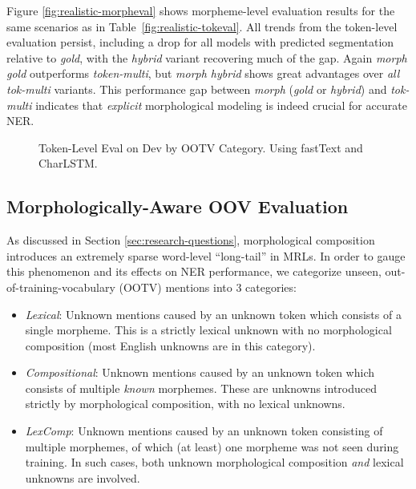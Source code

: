 \documentclass[11pt,a4paper]{article}
\newcommand{\MULMACRO}{{\em token-multi}\xspace}
\begin{document}
Figure \ref{fig:realistic-morpheval} shows morpheme-level evaluation results for the same scenarios as in Table~\ref{fig:realistic-tokeval}. 
All trends from the token-level evaluation persist, including  a drop for all models with predicted segmentation relative to {\em gold}, with the {\em hybrid} variant recovering much of the gap.
Again {\em morph gold}  outperforms \MULMACRO, but {\em morph hybrid} shows great advantages over {\em all} {\em tok-multi} variants. This  performance gap  between {\em morph} ({\em gold} or {\em hybrid}) and {\em tok-multi} indicates that {\em explicit} morphological modeling is indeed crucial for  accurate NER. 


\begin{figure}[t]
  \caption{\label{fig:analysis-ootv-fasttext} 
  Token-Level Eval on Dev by OOTV Category. Using fastText and CharLSTM.}
\end{figure}

\subsection{Morphologically-Aware OOV Evaluation}
\label{subsec:oov}


As discussed in Section \ref{sec:research-questions}, morphological composition introduces an extremely sparse word-level ``long-tail'' in MRLs. In order to gauge this phenomenon and its effects on NER performance, we categorize unseen, out-of-training-vocabulary (OOTV) mentions into 3 categories:
\begin{itemize}
    \item \emph{Lexical}: Unknown mentions caused by an unknown token which consists of a single morpheme. This is a strictly lexical unknown with no morphological composition  (most English   unknowns are in this category).
    \item \emph{Compositional}: Unknown mentions caused by an unknown token which consists of multiple \emph{known} morphemes. These are unknowns introduced strictly by morphological composition, with no lexical unknowns.
    \item \emph{LexComp}: Unknown mentions caused by an unknown token consisting of multiple morphemes, of which (at least) one morpheme was not seen during training. In such cases,  both unknown morphological composition \emph{and} lexical unknowns are involved. 
\end{itemize}
\end{document}
